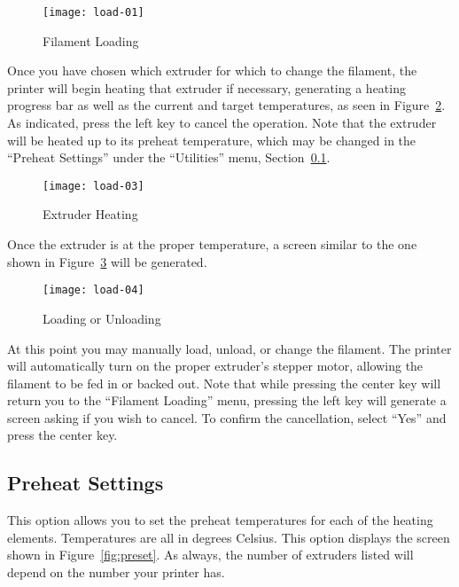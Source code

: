 \begin{figure}[!htbp]
  \centering
    \texttt{[image: load-01]}
    \caption{Filament Loading}
  \label{fig:filload}
\end{figure}

Once you have chosen which extruder for which to change the filament, the printer will begin heating that extruder if necessary, generating a heating progress bar as well as the current and target temperatures, as seen in Figure~\ref{fig:filheat}.  As indicated, press the left key to cancel the operation.  Note that the extruder will be heated up to its preheat temperature, which may be changed in the ``Preheat Settings'' under the ``Utilities'' menu, Section~\ref{sec:preheatset}.

\begin{figure}[!htbp]
  \centering
    \texttt{[image: load-03]}
    \caption{Extruder Heating}
  \label{fig:filheat}
\end{figure}

Once the extruder is at the proper temperature, a screen similar to the one shown in Figure~\ref{fig:filpro} will be generated.

\begin{figure}[!htbp]
  \centering
    \texttt{[image: load-04]}
    \caption{Loading or Unloading}
  \label{fig:filpro}
\end{figure}

At this point you may manually load, unload, or change the filament.  The printer will automatically turn on the proper extruder's stepper motor, allowing the filament to be fed in or backed out.  Note that while pressing the center key will return you to the ``Filament Loading'' menu, pressing the left key will generate a screen asking if you wish to cancel.  To confirm the cancellation, select ``Yes'' and press the center key.


\subsection{Preheat Settings} \label{sec:preheatset}

This option allows you to set the preheat temperatures for each of the heating elements.  Temperatures are all in degrees Celsius.  This option displays the screen shown in Figure~\ref{fig:preset}.  As always, the number of extruders listed will depend on the number your printer has.

